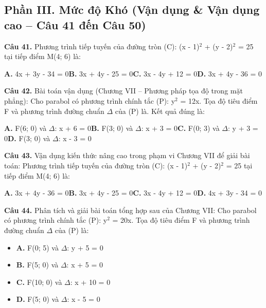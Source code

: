 \documentclass[11pt,a4paper]{article}
\begin{document}
\subsection*{\color{accent} Phần III. Mức độ Khó (Vận dụng \& Vận dụng cao -- Câu 41 đến Câu 50)}
\textbf{\color{primary} Câu 41.} Phương trình tiếp tuyến của đường tròn (C): (x - 1)$^2$ + (y - 2)$^2$ = 25 tại tiếp điểm M(4; 6) là:\par
\hspace*{1.5em}\textbf{A.} 4x + 3y - 34 = 0\quad\quad \textbf{B.} 3x + 4y - 25 = 0\quad\quad \textbf{C.} 3x - 4y + 12 = 0\quad\quad \textbf{D.} 3x + 4y - 36 = 0\par\vspace{2pt}
\textbf{\color{primary} Câu 42.} Bài toán vận dụng (Chương VII – Phương pháp tọa độ trong mặt phẳng): Cho parabol có phương trình chính tắc (P): y$^2$ = 12x. Tọa độ tiêu điểm F và phương trình đường chuẩn $\Delta$ của (P) là. Kết quả đúng là:\par
\hspace*{1.5em}\textbf{A.} F(6; 0) và $\Delta$: x + 6 = 0\quad\quad \textbf{B.} F(3; 0) và $\Delta$: x + 3 = 0\quad\quad \textbf{C.} F(0; 3) và $\Delta$: y + 3 = 0\quad\quad \textbf{D.} F(3; 0) và $\Delta$: x - 3 = 0\par\vspace{2pt}
\textbf{\color{primary} Câu 43.} Vận dụng kiến thức nâng cao trong phạm vi Chương VII để giải bài toán: Phương trình tiếp tuyến của đường tròn (C): (x - 1)$^2$ + (y - 2)$^2$ = 25 tại tiếp điểm M(4; 6) là:\par
\hspace*{1.5em}\textbf{A.} 3x + 4y - 36 = 0\quad\quad \textbf{B.} 3x + 4y - 25 = 0\quad\quad \textbf{C.} 3x - 4y + 12 = 0\quad\quad \textbf{D.} 4x + 3y - 34 = 0\par\vspace{2pt}
\textbf{\color{primary} Câu 44.} Phân tích và giải bài toán tổng hợp sau của Chương VII: Cho parabol có phương trình chính tắc (P): y$^2$ = 20x. Tọa độ tiêu điểm F và phương trình đường chuẩn $\Delta$ của (P) là:\par
\begin{itemize}\setlength{\itemsep}{1pt}\setlength{\parskip}{0pt}
  \item[] \textbf{A.} F(0; 5) và $\Delta$: y + 5 = 0
  \item[] \textbf{B.} F(5; 0) và $\Delta$: x + 5 = 0
  \item[] \textbf{C.} F(10; 0) và $\Delta$: x + 10 = 0
  \item[] \textbf{D.} F(5; 0) và $\Delta$: x - 5 = 0
\end{itemize}\vspace{2pt}
\end{document}
